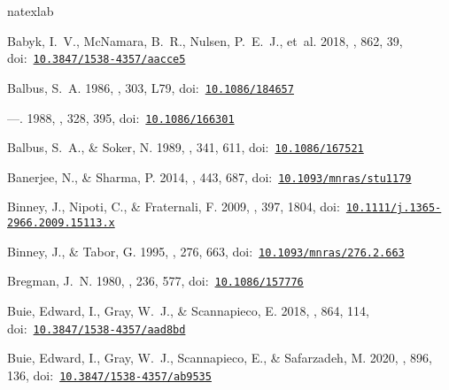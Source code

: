 \documentclass[twocolumn]{aastex63}
\begin{document}

\begin{thebibliography}{}
\expandafter\ifx\csname natexlab\endcsname\relax\def\natexlab#1{#1}\fi
\providecommand{\url}[1]{\href{#1}{#1}}
\providecommand{\dodoi}[1]{doi:~\href{http://doi.org/#1}{\nolinkurl{#1}}}
\providecommand{\doeprint}[1]{\href{http://ascl.net/#1}{\nolinkurl{http://ascl.net/#1}}}
\providecommand{\doarXiv}[1]{\href{https://arxiv.org/abs/#1}{\nolinkurl{https://arxiv.org/abs/#1}}}

{Babyk}, I.~V., {McNamara}, B.~R., {Nulsen}, P.~E.~J., {et~al.} 2018, \apj,
  862, 39, \dodoi{10.3847/1538-4357/aacce5}

{Balbus}, S.~A. 1986, \apjl, 303, L79, \dodoi{10.1086/184657}

---. 1988, \apj, 328, 395, \dodoi{10.1086/166301}

{Balbus}, S.~A., \& {Soker}, N. 1989, \apj, 341, 611, \dodoi{10.1086/167521}

{Banerjee}, N., \& {Sharma}, P. 2014, \mnras, 443, 687,
  \dodoi{10.1093/mnras/stu1179}

{Binney}, J., {Nipoti}, C., \& {Fraternali}, F. 2009, \mnras, 397, 1804,
  \dodoi{10.1111/j.1365-2966.2009.15113.x}

{Binney}, J., \& {Tabor}, G. 1995, \mnras, 276, 663,
  \dodoi{10.1093/mnras/276.2.663}

{Bregman}, J.~N. 1980, \apj, 236, 577, \dodoi{10.1086/157776}

{Buie}, Edward, I., {Gray}, W.~J., \& {Scannapieco}, E. 2018, \apj, 864, 114,
  \dodoi{10.3847/1538-4357/aad8bd}

{Buie}, Edward, I., {Gray}, W.~J., {Scannapieco}, E., \& {Safarzadeh}, M. 2020,
  \apj, 896, 136, \dodoi{10.3847/1538-4357/ab9535}


\end{thebibliography}
\end{document}
